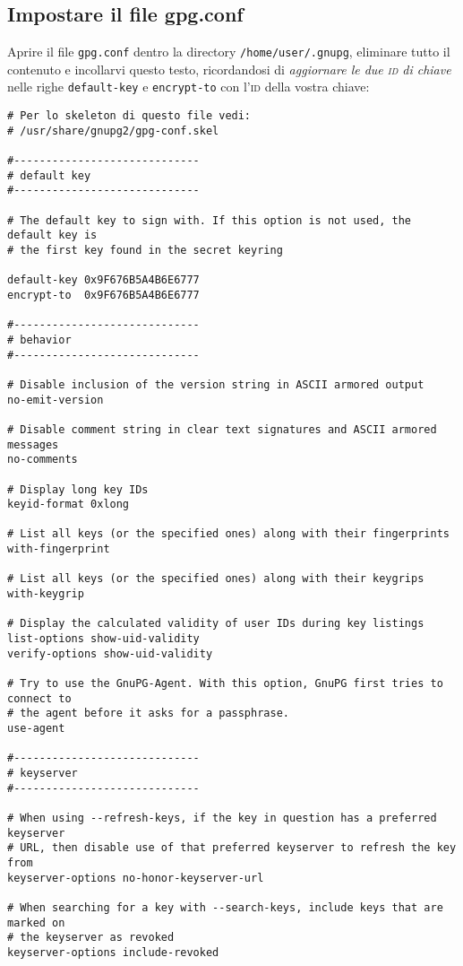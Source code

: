 \subsection{Impostare il file gpg.conf}

Aprire il file \texttt{gpg.conf} dentro la directory \texttt{/home/user/.gnupg},
eliminare tutto il contenuto e incollarvi questo testo, ricordandosi di
\emph{aggiornare le due \textsc{id} di chiave} nelle righe
\texttt{default-key} e \texttt{encrypt-to} con l'\textsc{id} della vostra
chiave:

\begin{lstlisting}
# Per lo skeleton di questo file vedi:
# /usr/share/gnupg2/gpg-conf.skel

#-----------------------------
# default key
#-----------------------------

# The default key to sign with. If this option is not used, the default key is
# the first key found in the secret keyring

default-key 0x9F676B5A4B6E6777
encrypt-to  0x9F676B5A4B6E6777

#-----------------------------
# behavior
#-----------------------------

# Disable inclusion of the version string in ASCII armored output
no-emit-version

# Disable comment string in clear text signatures and ASCII armored messages
no-comments

# Display long key IDs
keyid-format 0xlong

# List all keys (or the specified ones) along with their fingerprints
with-fingerprint

# List all keys (or the specified ones) along with their keygrips
with-keygrip

# Display the calculated validity of user IDs during key listings
list-options show-uid-validity
verify-options show-uid-validity

# Try to use the GnuPG-Agent. With this option, GnuPG first tries to connect to
# the agent before it asks for a passphrase.
use-agent

#-----------------------------
# keyserver
#-----------------------------

# When using --refresh-keys, if the key in question has a preferred keyserver
# URL, then disable use of that preferred keyserver to refresh the key from
keyserver-options no-honor-keyserver-url

# When searching for a key with --search-keys, include keys that are marked on
# the keyserver as revoked
keyserver-options include-revoked


\end{lstlisting}
